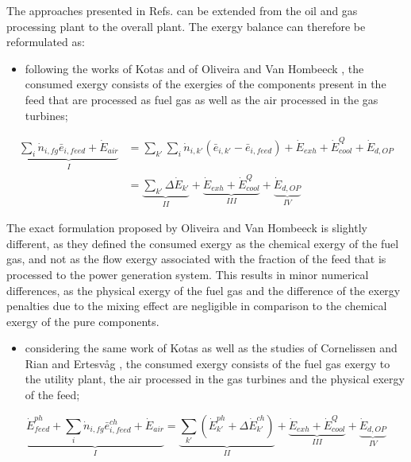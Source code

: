 The approaches presented in Refs. \cite{Kotas1995,Oliveira1997,Voldsund2010,Voldsund2012,Lazzaretto1999,Lazzaretto2006,Cornelissen1997,Rian2012} can be extended from the oil and gas processing plant to the overall plant. The exergy balance can therefore be reformulated as:

\begin{itemize}
	\item following the works of Kotas \cite{Kotas1995} and of Oliveira and Van Hombeeck \cite{Oliveira1997}, the consumed exergy consists of the exergies of the components present in the feed that are processed as fuel gas as well as the air processed in the gas turbines;
\end{itemize}

\begin{align}
	\underbrace{\sum_i \dot{n}_{i,fg}\bar{e}_{i,feed}+\dot{E}_{air}}_{I}&=\sum_{k'} \sum_i \dot{n}_{i,k'}\left(\bar{e}_{i,k'}-\bar{e}_{i,feed}\right)+\dot{E}_{exh}+\dot{E}^Q_{cool}+\dot{E}_{d,OP} \nonumber\\
	&=\underbrace{\sum_{k'}\Delta\dot{E}_{k'}}_{II}+\underbrace{\dot{E}_{exh}+\dot{E}^Q_{cool}}_{III}+\underbrace{\dot{E}_{d,OP}}_{IV}
	\label{eq:oliveira_nolosses}
\end{align}	
 
 The exact formulation proposed by Oliveira and Van Hombeeck \cite{Oliveira1997} is slightly different, as they defined the consumed exergy as the chemical exergy of the fuel gas, and not as the flow exergy associated with the fraction of the feed that is processed to the power generation system. This results in minor numerical differences, as the physical exergy of the fuel gas and the difference of the exergy penalties due to the mixing effect are negligible in comparison to the chemical exergy of the pure components.  
 
\begin{itemize}
	\item considering the same work of Kotas \cite{Kotas1995} as well as the studies of Cornelissen \cite{Cornelissen1997} and Rian and Ertesv\aa g \cite{Rian2012}, the consumed exergy consists of the fuel gas exergy to the utility plant, the air processed in the gas turbines and the physical exergy of the feed;
\end{itemize} 
 
 \begin{equation}
	\underbrace{\dot{E}^{ph}_{feed}+\sum_i \dot{n}_{i,fg}\bar{e}^{ch}_{i,feed}+\dot{E}_{air}}_{I}=\underbrace{\sum_{k'}\left(\dot{E}^{ph}_{k'}+\Delta{\dot{E}}^{ch}_{k'}\right)}_{II}+\underbrace{\dot{E}_{exh}+\dot{E}^Q_{cool}}_{III}+\underbrace{\dot{E}_{d,OP}}_{IV}
\end{equation}	

